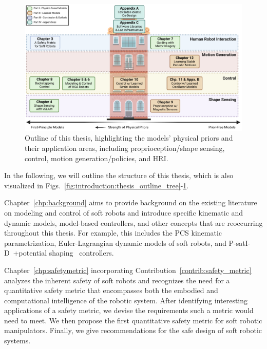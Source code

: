 \begin{figure}[ht]
    \centering
    \includegraphics[width=1.0\linewidth]{introduction/figures/thesis_outline_house_v2.pdf}
    \caption{
    Outline of this thesis, highlighting the models’ physical priors and their application areas, including proprioception/shape sensing, control, motion generation/policies, and \gls{HRI}.
    }
    \label{fig:introduction:thesis_outline_house}
\end{figure}

In the following, we will outline the structure of this thesis, which is also visualized in Figs.~\ref{fig:introduction:thesis_outline_tree}-\ref{fig:introduction:thesis_outline_house}.

Chapter~\ref{chp:background} aims to provide background on the existing literature on modeling and control of soft robots and introduce specific kinematic and dynamic models, model-based controllers, and other concepts that are reoccurring throughout this thesis.
For example, this includes the \gls{PCS} kinematic parametrization, Euler-Lagrangian dynamic models of soft robots, and P-satI-D~\citep{pustina2022p}+potential shaping~\citep{della2023model} controllers.

Chapter~\ref{chp:safetymetric} incorporating Contribution~\ref{contrib:safety_metric} analyzes the inherent safety of soft robots and recognizes the need for a quantitative safety metric that encompasses both the embodied and computational intelligence of the robotic system. After identifying interesting applications of a safety metric, we devise the requirements such a metric would need to meet. We then propose the first quantitative safety metric for soft robotic manipulators. Finally, we give recommendations for the safe design of soft robotic systems.

